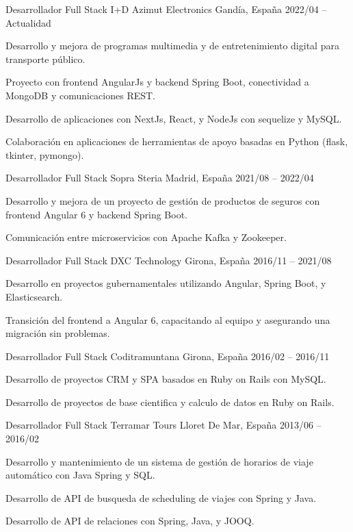 \documentclass[]{awesome-cv}
\begin{document}
\begin{cventries}
    \cventry
    {Desarrollador Full Stack I+D}
    {Azimut Electronics}
    {Gandía, España}
    {2022/04 – Actualidad}
    {\begin{cvitems}
        \item {Desarrollo y mejora de programas multimedia y de entretenimiento digital para transporte público.}
        \item {Proyecto con frontend AngularJs y backend Spring Boot, conectividad a MongoDB y comunicaciones REST.}
        \item {Desarrollo de aplicaciones con NextJs, React, y NodeJs con sequelize y MySQL.}
        \item {Colaboración en aplicaciones de herramientas de apoyo basadas en Python (flask, tkinter, pymongo).}
    \end{cvitems}}

    \cventry
    {Desarrollador Full Stack}
    {Sopra Steria}
    {Madrid, España}
    {2021/08 – 2022/04}
    {\begin{cvitems}
        \item {Desarrollo y mejora de un proyecto de gestión de productos de seguros con frontend Angular 6 y backend Spring Boot.}
        \item {Comunicación entre microservicios con Apache Kafka y Zookeeper.}
    \end{cvitems}}

    \cventry
    {Desarrollador Full Stack}
    {DXC Technology}
    {Girona, España}
    {2016/11 – 2021/08}
    {\begin{cvitems}
        \item {Desarrollo en proyectos gubernamentales utilizando Angular, Spring Boot, y Elasticsearch.}
        \item {Transición del frontend a Angular 6, capacitando al equipo y asegurando una migración sin problemas.}
    \end{cvitems}}

    \cventry
    {Desarrollador Full Stack}
    {Coditramuntana}
    {Girona, España}
    {2016/02 – 2016/11}
    {\begin{cvitems}
        \item {Desarrollo de proyectos CRM y SPA basados en Ruby on Rails con MySQL.}
        \item {Desarrollo de proyectos de base cientifica y calculo de datos en Ruby on Rails.}
    \end{cvitems}}

    \cventry
    {Desarrollador Full Stack}
    {Terramar Tours}
    {Lloret De Mar, España}
    {2013/06 – 2016/02}
    {\begin{cvitems}
        \item {Desarrollo y mantenimiento de un sistema de gestión de horarios de viaje automático con Java Spring y SQL.}
        \item {Desarrollo de API de busqueda de scheduling de viajes con Spring y Java.}
        \item {Desarrollo de API de relaciones con Spring, Java, y JOOQ.}
    \end{cvitems}}
\end{cventries}
\end{document}
